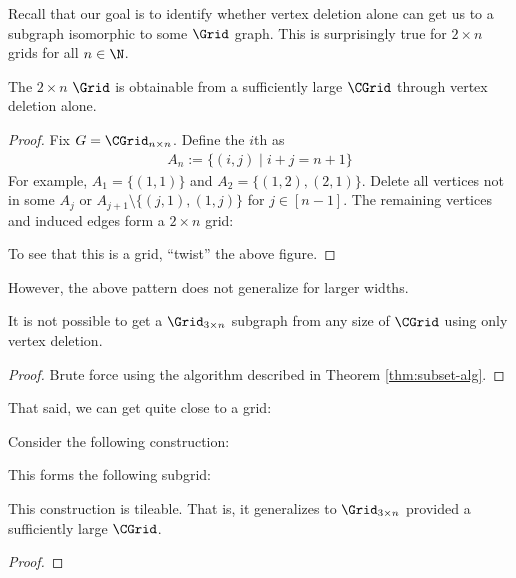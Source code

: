 Recall that our goal is to identify whether vertex deletion alone can get us to a subgraph isomorphic to some $\Grid$ graph. This is surprisingly true for $2 \times n$ grids for all $n \in \N$.

\begin{theorem}
The $2 \times n$ $\Grid$ is obtainable from a sufficiently large $\CGrid$ through vertex deletion alone.
\begin{proof}
Fix $G = \CGrid_{n \times n}$. Define the $i$th  as
\begin{align}
    A_n := \{ (i,j) \mid i + j = n + 1\}
\end{align}
For example, $A_1 = \{(1,1)\}$ and $A_2 = \{(1,2), (2,1)\}$. Delete all vertices not in some $A_j$ or $A_{j+1} \setminus \{(j,1),(1,j)\}$ for $j \in [n-1]$. The remaining vertices and induced edges form a $2 \times n$ grid:

To see that this is a grid, ``twist'' the above figure.
\end{proof}
\end{theorem}

However, the above pattern does not generalize for larger widths.

\begin{fact}
It is not possible to get a $\Grid_{3 \times n}$ subgraph from any size of $\CGrid$ using only vertex deletion.
\begin{proof}
Brute force using the algorithm described in Theorem \ref{thm:subset-alg}.
\end{proof}
\end{fact}

That said, we can get quite close to a grid:

\begin{definition}
\label{def:3n-subgrid}
Consider the following construction:

This forms the following subgrid:

This construction is tileable. That is, it generalizes to $\Grid_{3 \times n}$ provided a sufficiently large $\CGrid$.
\begin{proof}
\end{proof}
\end{definition}

